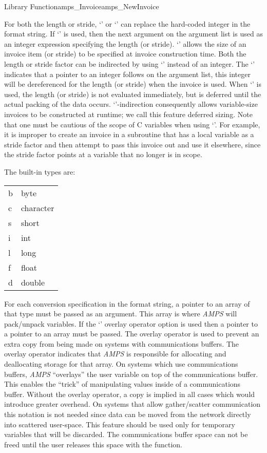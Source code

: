 \begin{deftypefn}{Library Function}{amps_Invoice}{amps\_NewInvoice}
{For both the length or stride, `\code{*}' or `\code{&}' can replace
the hard-coded integer in the format string.  If `\code{*}' is used,
then the next argument on the argument list is used as an integer
expression specifying the length (or stride).  `\code{*}' allows the
size of an invoice item (or stride) to be specified at invoice
construction time.  Both the length or stride factor can be indirected
by using `\code{&}' instead of an integer.  The `\code{&}' indicates
that a pointer to an integer follows on the argument list, this
integer will be dereferenced for the length (or stride) when the
invoice is used.  When `\code{&}' is used, the length (or stride) is
not evaluated immediately, but is deferred until the actual packing of
the data occurs.  `\code{&}'-indirection consequently allows
variable-size invoices to be constructed at runtime; we call this
feature deferred sizing.  Note that one must be cautious of the scope
of C variables when using `\code{&}'.  For example, it is improper to
create an invoice in a subroutine that has a local variable as a
stride factor and then attempt to pass this invoice out and use it
elsewhere, since the stride factor points at a variable that no longer
is in scope.

The built-in types are: 

\begin{tabular}{ll}
b & byte \\
c & character \\
s & short \\
i & int \\
l & long \\
f & float \\
d & double
\end{tabular}

For each conversion specification in the format string, a pointer to an
array of that type must be passed as an argument.  This array is where
{\em AMPS} will pack/unpack variables.  If the `' overlay
operator option is used then a pointer to a pointer to an array must be
passed.  The overlay operator is used to prevent an extra copy from
being made on systems with communications buffers.  The overlay operator
indicates that {\em AMPS} is responsible for allocating and
deallocating storage for that array.  On systems which use
communications buffers, {\em AMPS} ``overlays'' the user variable on
top of the communications buffer.  This enables the ``trick'' of
manipulating values inside of a communications buffer.  Without the
overlay operator, a copy is implied in all cases which would introduce
greater overhead.  On systems that allow gather/scatter communication
this notation is not needed since data can be moved from the network
directly into scattered user-space.  This feature should be used only
for temporary variables that will be discarded.  The communications
buffer space can not be freed until the user releases this space with
the  function.

}
\end{deftypefn}
